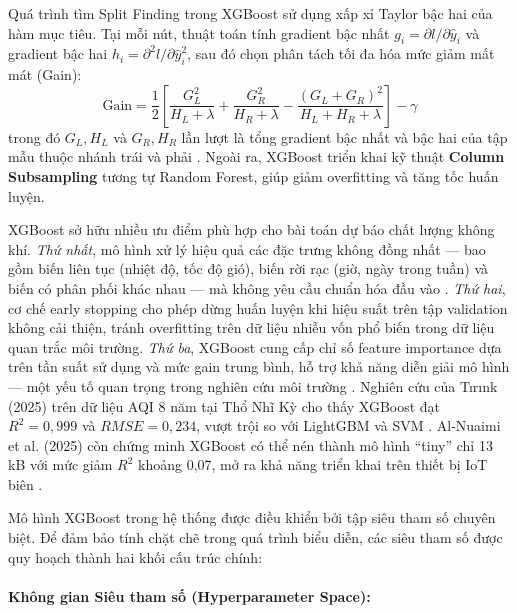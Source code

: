Quá trình tìm Split Finding trong XGBoost sử dụng xấp xỉ Taylor bậc hai của hàm mục tiêu. Tại mỗi nút, thuật toán tính gradient bậc nhất $g_i = \partial l / \partial \hat{y}_i$ và gradient bậc hai $h_i = \partial^2 l / \partial \hat{y}_i^2$, sau đó chọn phân tách tối đa hóa mức giảm mất mát (Gain):
\begin{equation}
    \text{Gain} = \frac{1}{2}\left[\frac{G_L^2}{H_L + \lambda} + \frac{G_R^2}{H_R + \lambda} - \frac{(G_L + G_R)^2}{H_L + H_R + \lambda}\right] - \gamma
\end{equation}
trong đó $G_L, H_L$ và $G_R, H_R$ lần lượt là tổng gradient bậc nhất và bậc hai của tập mẫu thuộc nhánh trái và phải \cite{Chen_2016}. Ngoài ra, XGBoost triển khai kỹ thuật \textbf{Column Subsampling} tương tự Random Forest, giúp giảm overfitting và tăng tốc huấn luyện.

XGBoost sở hữu nhiều ưu điểm phù hợp cho bài toán dự báo chất lượng không khí. \textit{Thứ nhất}, mô hình xử lý hiệu quả các đặc trưng không đồng nhất — bao gồm biến liên tục (nhiệt độ, tốc độ gió), biến rời rạc (giờ, ngày trong tuần) và biến có phân phối khác nhau — mà không yêu cầu chuẩn hóa đầu vào \cite{Chen_2016}. \textit{Thứ hai}, cơ chế early stopping cho phép dừng huấn luyện khi hiệu suất trên tập validation không cải thiện, tránh overfitting trên dữ liệu nhiễu vốn phổ biến trong dữ liệu quan trắc môi trường. \textit{Thứ ba}, XGBoost cung cấp chỉ số feature importance dựa trên tần suất sử dụng và mức gain trung bình, hỗ trợ khả năng diễn giải mô hình — một yếu tố quan trọng trong nghiên cứu môi trường \cite{tirink2025aqi}. Nghiên cứu của Tırınk (2025) trên dữ liệu AQI 8 năm tại Thổ Nhĩ Kỳ cho thấy XGBoost đạt $R^2 = 0{,}999$ và $RMSE = 0{,}234$, vượt trội so với LightGBM và SVM \cite{tirink2025aqi}. Al-Nuaimi et al. (2025) còn chứng minh XGBoost có thể nén thành mô hình ``tiny'' chỉ 13 kB với mức giảm $R^2$ khoảng 0,07, mở ra khả năng triển khai trên thiết bị IoT biên \cite{alnuaimi2025lightweight}.

Mô hình XGBoost trong hệ thống được điều khiển bởi tập siêu tham số chuyên biệt. Để đảm bảo tính chặt chẽ trong quá trình biểu diễn, các siêu tham số được quy hoạch thành hai khối cấu trúc chính:

\paragraph{Không gian Siêu tham số (Hyperparameter Space):}

